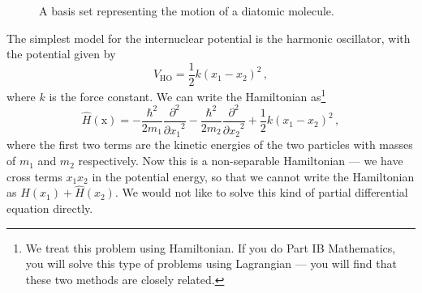 \documentclass{article}
\theoremstyle{plain}\theoremheaderfont{\normalfont\itshape}\theorembodyfont{\rmfamily}\theoremseparator{.}\newtheorem*{rem}{Remark}\newtheorem*{ex}{Example}\newtheorem*{proof}{Proof}\newtheorem*{altp}{Alternative proof}
\theoremstyle{plain}\theoremheaderfont{\normalfont\bfseries}\theorembodyfont{\rmfamily}\theoremseparator{.}\newtheorem{thm}{Theorem}[section]\newtheorem{lem}[thm]{Lemma}\newtheorem{prop}[thm]{Proposition}\newtheorem*{cor}{Corollary}\newtheorem{defn}[thm]{Definition}\newtheorem{clm}[thm]{Claim}\newtheorem{clminproof}{Claim}
\theoremstyle{break}\theoremheaderfont{\normalfont\itshape}\theorembodyfont{\rmfamily}\theoremseparator{.\medskip}\newtheorem*{proofskip}{Proof}\newtheorem*{exs}{Examples}\newtheorem*{rems}{Remarks}
\theoremstyle{break}\theoremheaderfont{\normalfont\bfseries}\theorembodyfont{\rmfamily}\theoremseparator{.\medskip}\newtheorem{lemskip}[thm]{Lemma}\newtheorem{defnskip}[thm]{Definition}\newtheorem{propskip}[thm]{Proposition}\newtheorem{thmskip}[thm]{Theorem}
\numberwithin{equation}{section}
\newcommand{\pdv}[3][]{\frac{\partial^{#1} #2}{{\partial #3}^{#1}}}
\newcommand{\vb}[1]{\bm{\mathrm{#1}}}
\begin{document}
    \begin{figure}[ht!]
        \centering
        \caption{A basis set representing the motion of a diatomic molecule.}
    \end{figure}

    The simplest model for the internuclear potential is the harmonic oscillator, with the potential given by
    \begin{equation}
        V_{\text{HO}}=\frac{1}{2}k(x_1-x_2)^2\,,
    \end{equation}
    where \(k\) is the force constant. We can write the Hamiltonian as\footnote{We treat this problem using Hamiltonian. If you do Part IB Mathematics, you will solve this type of problems using Lagrangian --- you will find that these two methods are closely related.}
    \begin{equation}
        \hat{H}(\vb{x})=-\frac{\hbar^2}{2m_1}\pdv[2]{}{x_1}-\frac{\hbar^2}{2m_2}\pdv[2]{}{x_2}+\frac{1}{2}k(x_1-x_2)^2\,,
    \end{equation}
    where the first two terms are the kinetic energies of the two particles with masses of \(m_1\) and \(m_2\) respectively. Now this is a non-separable Hamiltonian --- we have cross terms \(x_1x_2\) in the potential energy, so that we cannot write the Hamiltonian as \(\hat{H}(x_1)+\hat{H}(x_2)\). We would not like to solve this kind of partial differential equation directly.
\end{document}

